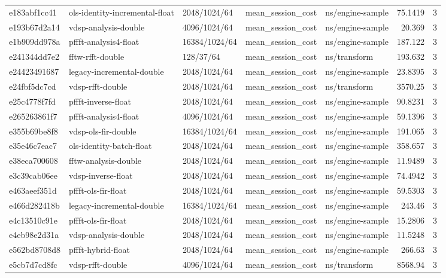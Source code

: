 \begin{longtable}{lllllrr}
e183abf1cc41 & ols-identity-incremental-float & 2048/1024/64 & mean\_session\_cost & ns/engine-sample & 75.1419 & 3 \\
e193b67d2a14 & vdsp-analysis-double & 4096/1024/64 & mean\_session\_cost & ns/engine-sample & 20.369 & 3 \\
e1b909dd978a & pffft-analysis4-float & 16384/1024/64 & mean\_session\_cost & ns/engine-sample & 187.122 & 3 \\
e241344dd7e2 & fftw-rfft-double & 128/37/64 & mean\_session\_cost & ns/transform & 193.632 & 3 \\
e24423491687 & legacy-incremental-double & 2048/1024/64 & mean\_session\_cost & ns/engine-sample & 23.8395 & 3 \\
e24fbf5dc7cd & vdsp-rfft-double & 2048/1024/64 & mean\_session\_cost & ns/transform & 3570.25 & 3 \\
e25c4778f7fd & pffft-inverse-float & 2048/1024/64 & mean\_session\_cost & ns/engine-sample & 90.8231 & 3 \\
e265263861f7 & pffft-analysis4-float & 4096/1024/64 & mean\_session\_cost & ns/engine-sample & 59.1396 & 3 \\
e355b69be8f8 & vdsp-ols-fir-double & 16384/1024/64 & mean\_session\_cost & ns/engine-sample & 191.065 & 3 \\
e35e46c7eac7 & ols-identity-batch-float & 2048/1024/64 & mean\_session\_cost & ns/engine-sample & 358.657 & 3 \\
e38eca700608 & fftw-analysis-double & 2048/1024/64 & mean\_session\_cost & ns/engine-sample & 11.9489 & 3 \\
e3c39cab06ee & vdsp-inverse-float & 2048/1024/64 & mean\_session\_cost & ns/engine-sample & 74.4942 & 3 \\
e463aeef351d & pffft-ols-fir-float & 2048/1024/64 & mean\_session\_cost & ns/engine-sample & 59.5303 & 3 \\
e466d282418b & legacy-incremental-double & 16384/1024/64 & mean\_session\_cost & ns/engine-sample & 243.46 & 3 \\
e4c13510c91e & pffft-ols-fir-float & 2048/1024/64 & mean\_session\_cost & ns/engine-sample & 15.2806 & 3 \\
e4eb98e2d31a & vdsp-analysis-double & 2048/1024/64 & mean\_session\_cost & ns/engine-sample & 11.5248 & 3 \\
e562bd8708d8 & pffft-hybrid-float & 2048/1024/64 & mean\_session\_cost & ns/engine-sample & 266.63 & 3 \\
e5cb7d7cd8fc & vdsp-rfft-double & 4096/1024/64 & mean\_session\_cost & ns/transform & 8568.94 & 3 \\

\end{longtable}
